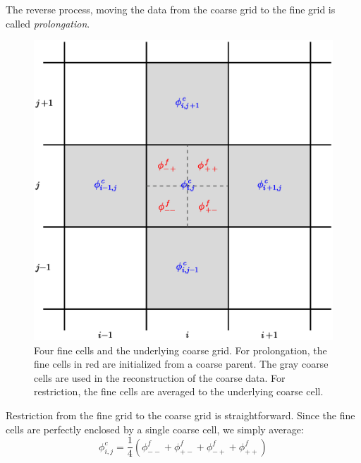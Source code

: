 The reverse process, moving the data from the coarse grid to the
fine grid is called {\em prolongation}.

\begin{figure}[t]
\centering
\includegraphics[width=0.8\linewidth]{2dgrid-prolong}
\caption[The geometry for 2-d
  prolongation and restriction]{\label{fig:2dgrid-prolong} Four fine cells and the
  underlying coarse grid.  For prolongation, the fine cells in red are
  initialized from a coarse parent.  The gray coarse cells are used in
  the reconstruction of the coarse data.  For restriction, the fine
  cells are averaged to the underlying coarse cell.}
\end{figure}

Restriction from the fine grid to the coarse grid is straightforward.
Since the fine cells are perfectly enclosed by a single coarse cell,
we simply average:
\begin{equation}
\phi_{i,j}^c = \frac{1}{4} ( \phi_{--}^f + \phi_{+-}^f +
                             \phi_{-+}^f + \phi_{++}^f )
\end{equation}

